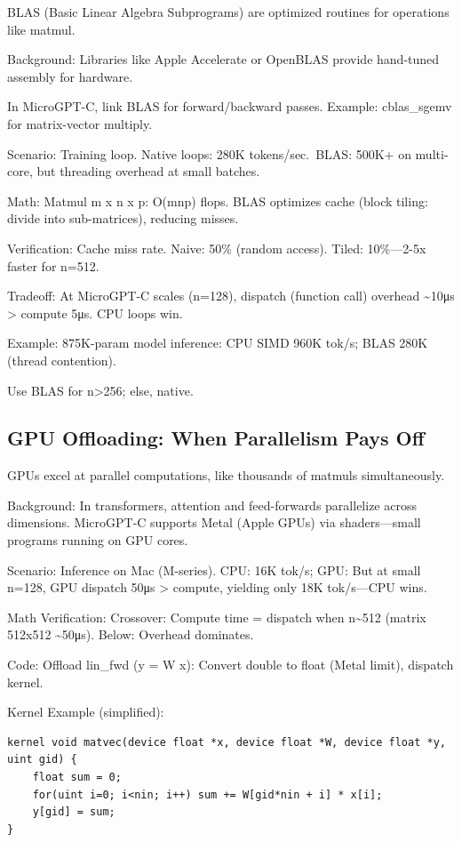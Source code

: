 \documentclass[
]{article}
\begin{document}
BLAS (Basic Linear Algebra Subprograms) are optimized routines for
operations like matmul.

Background: Libraries like Apple Accelerate or OpenBLAS provide
hand-tuned assembly for hardware.

In MicroGPT-C, link BLAS for forward/backward passes. Example:
cblas\_sgemv for matrix-vector multiply.

Scenario: Training loop. Native loops: 280K tokens/sec.~BLAS: 500K+ on
multi-core, but threading overhead at small batches.

Math: Matmul m x n x p: O(mnp) flops. BLAS optimizes cache (block
tiling: divide into sub-matrices), reducing misses.

Verification: Cache miss rate. Naive: 50\% (random access). Tiled:
10\%---2-5x faster for n=512.

Tradeoff: At MicroGPT-C scales (n=128), dispatch (function call)
overhead \textasciitilde10μs \textgreater{} compute 5μs. CPU loops win.

Example: 875K-param model inference: CPU SIMD 960K tok/s; BLAS 280K
(thread contention).

Use BLAS for n\textgreater256; else, native.

\subsection{GPU Offloading: When Parallelism Pays
Off}\label{gpu-offloading-when-parallelism-pays-off}

GPUs excel at parallel computations, like thousands of matmuls
simultaneously.

Background: In transformers, attention and feed-forwards parallelize
across dimensions. MicroGPT-C supports Metal (Apple GPUs) via
shaders---small programs running on GPU cores.

Scenario: Inference on Mac (M-series). CPU: 16K tok/s; GPU: But at small
n=128, GPU dispatch 50μs \textgreater{} compute, yielding only 18K
tok/s---CPU wins.

Math Verification: Crossover: Compute time = dispatch when
n\textasciitilde512 (matrix 512x512 \textasciitilde50μs). Below:
Overhead dominates.

Code: Offload lin\_fwd (y = W x): Convert double to float (Metal limit),
dispatch kernel.

Kernel Example (simplified):

\begin{verbatim}
kernel void matvec(device float *x, device float *W, device float *y, uint gid) {
    float sum = 0;
    for(uint i=0; i<nin; i++) sum += W[gid*nin + i] * x[i];
    y[gid] = sum;
}
\end{verbatim}
\end{document}
